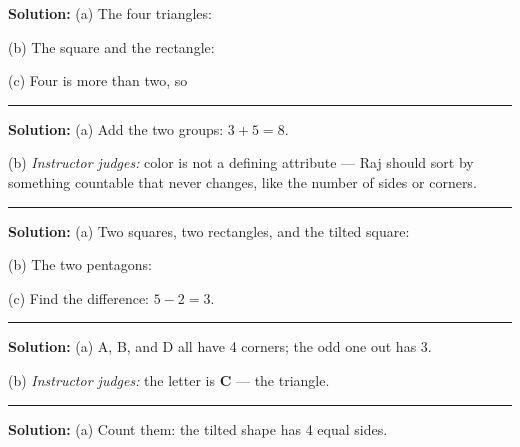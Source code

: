 \documentclass[12pt]{article}
\begin{document}

\textbf{Solution:} (a) The four triangles: 

(b) The square and the rectangle: 

(c) Four is more than two, so 

\vspace{0.2cm}\noindent\rule{\linewidth}{0.2pt}\vspace{0.1cm}


\textbf{Solution:} (a) Add the two groups: $3 + 5 = 8$. 

(b) \emph{Instructor judges:} color is not a defining attribute --- Raj
should sort by something countable that never changes, like the number of
sides or corners.

\vspace{0.2cm}\noindent\rule{\linewidth}{0.2pt}\vspace{0.1cm}


\textbf{Solution:} (a) Two squares, two rectangles, and the tilted square:

(b) The two pentagons: 

(c) Find the difference: $5 - 2 = 3$. 

\vspace{0.2cm}\noindent\rule{\linewidth}{0.2pt}\vspace{0.1cm}


\textbf{Solution:} (a) A, B, and D all have 4 corners; the odd one out has
3. 

(b) \emph{Instructor judges:} the letter is \textbf{C} --- the triangle.

\vspace{0.2cm}\noindent\rule{\linewidth}{0.2pt}\vspace{0.1cm}


\textbf{Solution:} (a) Count them: the tilted shape has 4 equal sides.
\end{document}
